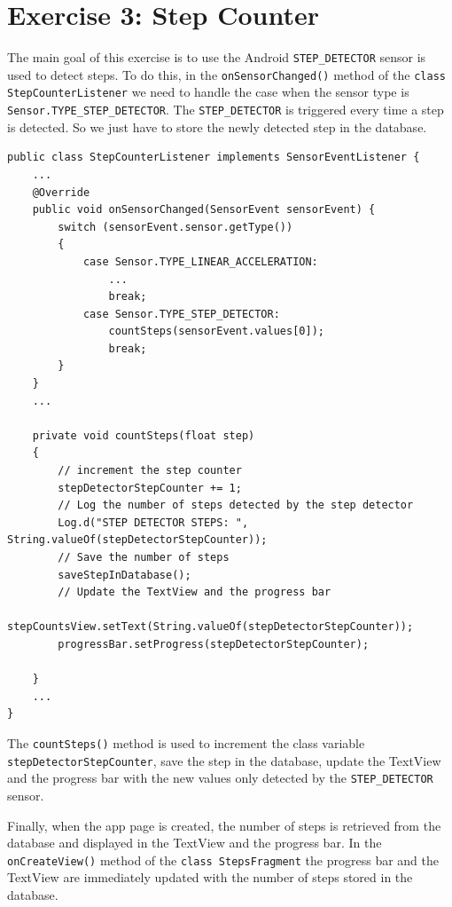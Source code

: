 \documentclass{usireport}
\begin{document}
\newpage
\section{Exercise 3: Step Counter}

The main goal of this exercise is to use the Android \texttt{STEP\_DETECTOR} sensor is used to detect steps.
To do this, in the \texttt{onSensorChanged()} method of the \texttt{class StepCounterListener} we need to handle the case when the sensor type is \texttt{Sensor.TYPE_STEP_DETECTOR}. The \texttt{STEP\_DETECTOR} is triggered every time a step is detected. So we just have to store the newly detected step in the database. 

\begin{verbatim}
public class StepCounterListener implements SensorEventListener {
    ...
    @Override
    public void onSensorChanged(SensorEvent sensorEvent) {
        switch (sensorEvent.sensor.getType())
        {
            case Sensor.TYPE_LINEAR_ACCELERATION:
                ...
                break;
            case Sensor.TYPE_STEP_DETECTOR:
                countSteps(sensorEvent.values[0]);
                break;
        }
    }
    ...

    private void countSteps(float step)
    {   
        // increment the step counter
        stepDetectorStepCounter += 1;
        // Log the number of steps detected by the step detector
        Log.d("STEP DETECTOR STEPS: ", String.valueOf(stepDetectorStepCounter));
        // Save the number of steps
        saveStepInDatabase();
        // Update the TextView and the progress bar
        stepCountsView.setText(String.valueOf(stepDetectorStepCounter));
        progressBar.setProgress(stepDetectorStepCounter);

    }
    ...
}
\end{verbatim}

The \texttt{countSteps()} method is used to increment the class variable \texttt{stepDetectorStepCounter}, save the step in the database, update the TextView and the progress bar with the new values only detected by the \texttt{STEP\_DETECTOR} sensor.

Finally, when the app page is created, the number of steps is retrieved from the database and displayed in the TextView and the progress bar. In the \texttt{onCreateView()} method of the \texttt{class StepsFragment} the progress bar and the TextView are immediately updated with the number of steps stored in the database.
\end{document}
